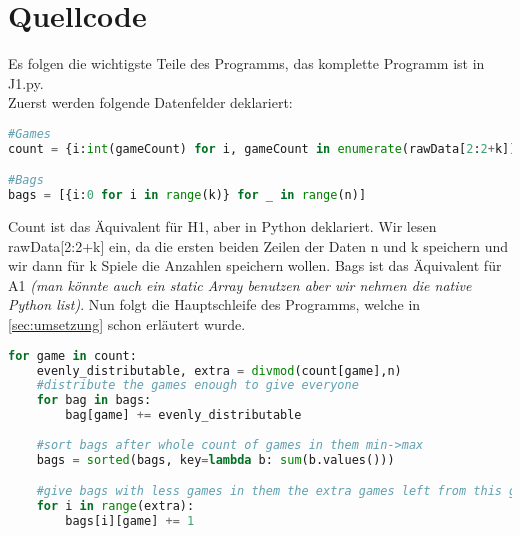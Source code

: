 \documentclass[a4paper,10pt,ngerman]{scrartcl}
\begin{document}
\section{Quellcode}
Es folgen die wichtigste Teile des Programms, das komplette Programm ist in J1.py.\\
Zuerst werden folgende Datenfelder deklariert:
\begin{lstlisting}[language=Python]
#Games
count = {i:int(gameCount) for i, gameCount in enumerate(rawData[2:2+k])}

#Bags
bags = [{i:0 for i in range(k)} for _ in range(n)]
\end{lstlisting}
Count ist das Äquivalent für H1, aber in Python deklariert. Wir lesen rawData[2:2+k] ein, da die ersten beiden Zeilen der Daten n und k speichern und wir dann für k Spiele die Anzahlen speichern wollen.
Bags ist das Äquivalent für A1 \emph{(man könnte auch ein static Array benutzen aber wir nehmen die native Python list)}.
Nun folgt die Hauptschleife des Programms, welche in \cref{sec:umsetzung} schon erläutert wurde.
\begin{lstlisting}[language=Python]
for game in count:
    evenly_distributable, extra = divmod(count[game],n)
    #distribute the games enough to give everyone
    for bag in bags:
        bag[game] += evenly_distributable
    
    #sort bags after whole count of games in them min->max
    bags = sorted(bags, key=lambda b: sum(b.values()))

    #give bags with less games in them the extra games left from this game first
    for i in range(extra):
        bags[i][game] += 1
\end{lstlisting}
\end{document}
